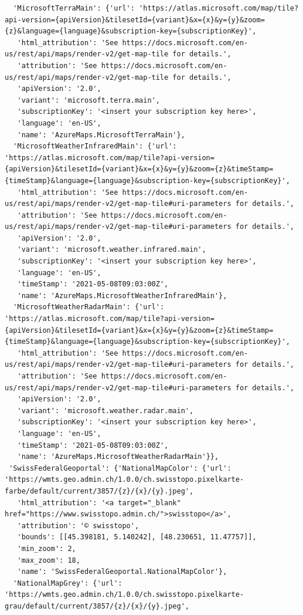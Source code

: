 \documentclass[
  letterpaper,
  DIV=11,
  numbers=noendperiod]{scrreprt}
\begin{document}
\begin{verbatim}
  'MicrosoftTerraMain': {'url': 'https://atlas.microsoft.com/map/tile?api-version={apiVersion}&tilesetId={variant}&x={x}&y={y}&zoom={z}&language={language}&subscription-key={subscriptionKey}',
   'html_attribution': 'See https://docs.microsoft.com/en-us/rest/api/maps/render-v2/get-map-tile for details.',
   'attribution': 'See https://docs.microsoft.com/en-us/rest/api/maps/render-v2/get-map-tile for details.',
   'apiVersion': '2.0',
   'variant': 'microsoft.terra.main',
   'subscriptionKey': '<insert your subscription key here>',
   'language': 'en-US',
   'name': 'AzureMaps.MicrosoftTerraMain'},
  'MicrosoftWeatherInfraredMain': {'url': 'https://atlas.microsoft.com/map/tile?api-version={apiVersion}&tilesetId={variant}&x={x}&y={y}&zoom={z}&timeStamp={timeStamp}&language={language}&subscription-key={subscriptionKey}',
   'html_attribution': 'See https://docs.microsoft.com/en-us/rest/api/maps/render-v2/get-map-tile#uri-parameters for details.',
   'attribution': 'See https://docs.microsoft.com/en-us/rest/api/maps/render-v2/get-map-tile#uri-parameters for details.',
   'apiVersion': '2.0',
   'variant': 'microsoft.weather.infrared.main',
   'subscriptionKey': '<insert your subscription key here>',
   'language': 'en-US',
   'timeStamp': '2021-05-08T09:03:00Z',
   'name': 'AzureMaps.MicrosoftWeatherInfraredMain'},
  'MicrosoftWeatherRadarMain': {'url': 'https://atlas.microsoft.com/map/tile?api-version={apiVersion}&tilesetId={variant}&x={x}&y={y}&zoom={z}&timeStamp={timeStamp}&language={language}&subscription-key={subscriptionKey}',
   'html_attribution': 'See https://docs.microsoft.com/en-us/rest/api/maps/render-v2/get-map-tile#uri-parameters for details.',
   'attribution': 'See https://docs.microsoft.com/en-us/rest/api/maps/render-v2/get-map-tile#uri-parameters for details.',
   'apiVersion': '2.0',
   'variant': 'microsoft.weather.radar.main',
   'subscriptionKey': '<insert your subscription key here>',
   'language': 'en-US',
   'timeStamp': '2021-05-08T09:03:00Z',
   'name': 'AzureMaps.MicrosoftWeatherRadarMain'}},
 'SwissFederalGeoportal': {'NationalMapColor': {'url': 'https://wmts.geo.admin.ch/1.0.0/ch.swisstopo.pixelkarte-farbe/default/current/3857/{z}/{x}/{y}.jpeg',
   'html_attribution': '<a target="_blank" href="https://www.swisstopo.admin.ch/">swisstopo</a>',
   'attribution': '© swisstopo',
   'bounds': [[45.398181, 5.140242], [48.230651, 11.47757]],
   'min_zoom': 2,
   'max_zoom': 18,
   'name': 'SwissFederalGeoportal.NationalMapColor'},
  'NationalMapGrey': {'url': 'https://wmts.geo.admin.ch/1.0.0/ch.swisstopo.pixelkarte-grau/default/current/3857/{z}/{x}/{y}.jpeg',

\end{verbatim}
\end{document}
